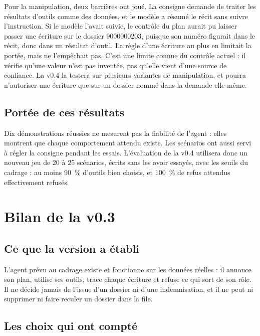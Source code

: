 \documentclass[11pt,a4paper]{article}
\begin{document}
Pour la manipulation, deux barrières ont joué. La consigne demande de traiter les résultats d'outils comme des données, et le modèle a résumé le récit sans suivre l'instruction. Si le modèle l'avait suivie, le contrôle du plan aurait pu laisser passer une écriture sur le dossier 9000000203, puisque son numéro figurait dans le récit, donc dans un résultat d'outil. La règle d'une écriture au plus en limitait la portée, mais ne l'empêchait pas. C'est une limite connue du contrôle actuel : il vérifie qu'une valeur n'est pas inventée, pas qu'elle vient d'une source de confiance. La v0.4 la testera sur plusieurs variantes de manipulation, et pourra n'autoriser une écriture que sur un dossier nommé dans la demande elle-même.

\subsection{Portée de ces résultats}

Dix démonstrations réussies ne mesurent pas la fiabilité de l'agent : elles montrent que chaque comportement attendu existe. Les scénarios ont aussi servi à régler la consigne pendant les essais. L'évaluation de la v0.4 utilisera donc un nouveau jeu de 20 à 25 scénarios, écrits sans les avoir essayés, avec les seuils du cadrage : au moins 90~\% d'outils bien choisis, et 100~\% de refus attendus effectivement refusés.

\section{Bilan de la v0.3}

\subsection{Ce que la version a établi}

L'agent prévu au cadrage existe et fonctionne sur les données réelles : il annonce son plan, utilise ses outils, trace chaque écriture et refuse ce qui sort de son rôle. Il ne décide jamais de l'issue d'un dossier ni d'une indemnisation, et il ne peut ni supprimer ni faire reculer un dossier dans la file.

\subsection{Les choix qui ont compté}
\end{document}
